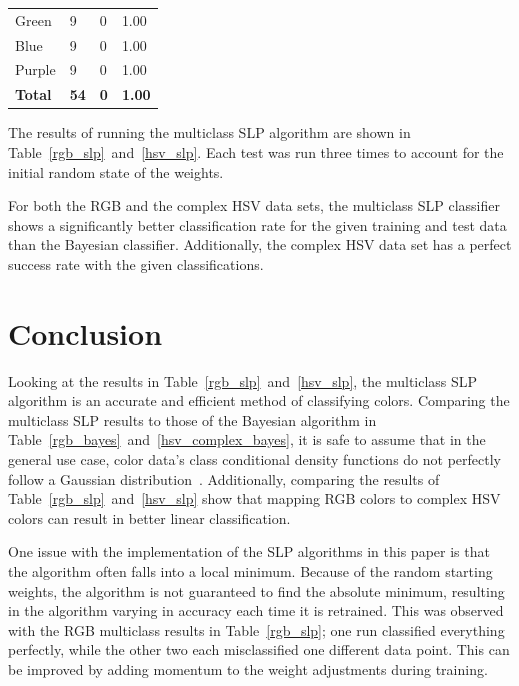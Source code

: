 \documentclass[twoside]{IEEEtran}
\begin{document}
\begin{table}[!t]
\begin{minipage}{\columnwidth}
\begin{tabular}{ l l l l }
            Green           & 9                    & 0                       & 1.00                   \\
            Blue            & 9                    & 0                       & 1.00                   \\
            Purple          & 9                    & 0                       & 1.00                   \\
            \midrule
            \bfseries Total & \bfseries 54         & \bfseries 0             & \bfseries 1.00         \\
            \bottomrule
        \end{tabular}
    \end{minipage}
\end{table}

The results of running the multiclass SLP algorithm are shown in Table~\ref{rgb_slp}~and~\ref{hsv_slp}. Each test was
run three times to account for the initial random state of the weights.

For both the RGB and the complex HSV data sets, the multiclass SLP classifier shows a
significantly better classification rate for the given training and test data than the Bayesian
classifier. Additionally, the complex HSV data set has a perfect success rate with the given
classifications.

\section{Conclusion}

Looking at the results in Table~\ref{rgb_slp}~and~\ref{hsv_slp}, the multiclass SLP algorithm is an accurate and efficient
method of classifying colors. Comparing the multiclass SLP results to those of the Bayesian
algorithm in Table~\ref{rgb_bayes}~and~\ref{hsv_complex_bayes}, it is safe to assume that in the general use case, color data's class
conditional density functions do not perfectly follow a Gaussian distribution~\cite{farmer}. Additionally,
comparing the results of Table~\ref{rgb_slp}~and~\ref{hsv_slp} show that mapping RGB colors to complex HSV
colors can result in better linear classification.

One issue with the implementation of the SLP algorithms in this paper is that the algorithm often
falls into a local minimum. Because of the random starting weights, the algorithm is not
guaranteed to find the absolute minimum, resulting in the algorithm varying in accuracy each
time it is retrained. This was observed with the RGB multiclass results in Table~\ref{rgb_slp}; one run
classified everything perfectly, while the other two each misclassified one different data point.
This can be improved by adding momentum to the weight adjustments during training.
\end{document}
